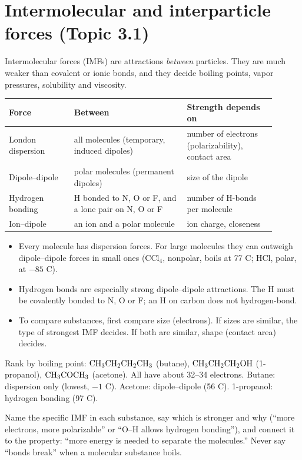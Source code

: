 \documentclass[11pt]{article}
\begin{document}
\section{Intermolecular and interparticle forces (Topic 3.1)}\label{t:3.1}
Intermolecular forces (IMFs) are attractions \emph{between} particles. They are much weaker than covalent or ionic bonds, and they decide boiling points, vapor pressures, solubility and viscosity.
\begin{center}
\begin{tabular}{p{0.22\linewidth}p{0.38\linewidth}p{0.30\linewidth}}\toprule
Force & Between & Strength depends on \\ \midrule
London dispersion & all molecules (temporary, induced dipoles) & number of electrons (polarizability), contact area \\
Dipole--dipole & polar molecules (permanent dipoles) & size of the dipole \\
Hydrogen bonding & H bonded to N, O or F, and a lone pair on N, O or F & number of H-bonds per molecule \\
Ion--dipole & an ion and a polar molecule & ion charge, closeness \\ \bottomrule
\end{tabular}
\end{center}
\begin{itemize}
\item Every molecule has dispersion forces. For large molecules they can outweigh dipole--dipole forces in small ones (CCl$_4$, nonpolar, boils at 77 \textdegree C; HCl, polar, at $-85$ \textdegree C).
\item Hydrogen bonds are especially strong dipole--dipole attractions. The H must be covalently bonded to N, O or F; an H on carbon does not hydrogen-bond.
\item To compare substances, first compare size (electrons). If sizes are similar, the type of strongest IMF decides. If both are similar, shape (contact area) decides.
\end{itemize}
 Rank by boiling point: $\ce{CH3CH2CH2CH3}$ (butane), $\ce{CH3CH2CH2OH}$ (1-propanol), $\ce{CH3COCH3}$ (acetone). All have about 32--34 electrons. Butane: dispersion only (lowest, $-1$ \textdegree C). Acetone: dipole--dipole (56 \textdegree C). 1-propanol: hydrogen bonding (97 \textdegree C).

\frph Name the specific IMF in each substance, say which is stronger and why (``more electrons, more polarizable'' or ``O--H allows hydrogen bonding''), and connect it to the property: ``more energy is needed to separate the molecules.'' Never say ``bonds break'' when a molecular substance boils.
\end{document}
